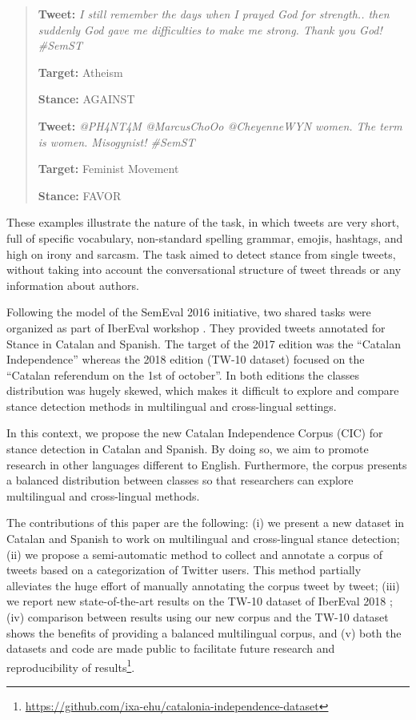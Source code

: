 \documentclass[10pt, a4paper]{article}
\begin{document}
\begin{quote}
\textbf{Tweet:} \textit{I still remember the days when I prayed God for strength.. then suddenly God gave me difficulties to make me strong. Thank you God! \#SemST}

\textbf{Target:} Atheism

\textbf{Stance:} AGAINST

\vspace{0.5cm}

\textbf{Tweet:} \textit{@PH4NT4M @MarcusChoOo @CheyenneWYN women. The term is women. Misogynist! \#SemST}

\textbf{Target:} Feminist Movement

\textbf{Stance:} FAVOR
\end{quote}

These examples illustrate the nature of the task, in which tweets are very short, full of specific vocabulary, non-standard spelling grammar, emojis, hashtags, and high on irony and sarcasm. The task aimed to detect stance from single tweets, without taking into account the conversational structure of tweet threads or any information about authors.

Following the model of the SemEval 2016 initiative, two shared tasks were organized as part of IberEval workshop \cite{taule17,taule18}. They provided tweets annotated for Stance in Catalan and Spanish. The target of the 2017 edition was the ``Catalan Independence'' whereas the 2018 edition (TW-10 dataset) focused on the ``Catalan referendum on the 1st of october''. In both editions the classes distribution was hugely skewed, which makes it difficult to explore and compare stance detection methods in multilingual and cross-lingual settings.

In this context, we propose the new Catalan Independence Corpus (CIC) for stance detection in Catalan and Spanish. By doing so, we aim to promote research in other languages different to English. Furthermore, the corpus presents a balanced distribution between classes so that researchers can explore multilingual and cross-lingual methods.

The contributions of this paper are the following: (i) we present a new dataset in Catalan and Spanish to work on multilingual and cross-lingual stance detection; (ii) we propose a semi-automatic method to collect and annotate a corpus of tweets based on a categorization of Twitter users. This method partially alleviates the huge effort of manually annotating the corpus tweet by tweet; (iii) we report new state-of-the-art results on the TW-10 dataset of IberEval 2018 \cite{taule18}; (iv) comparison between results using our new corpus and the TW-10 dataset shows the benefits of providing a balanced multilingual corpus, and (v) both the datasets and code are made public to facilitate future research and reproducibility of results\footnote{\url{https://github.com/ixa-ehu/catalonia-independence-dataset}}.
\end{document}
